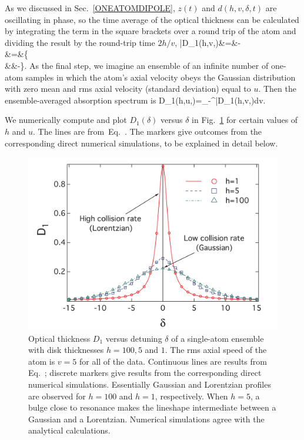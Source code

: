 As we discussed in Sec.~\ref{ONEATOMDIPOLE}, $z(t)$ and $d(h,v,\delta,t)$ are oscillating in phase, so the time average of the optical thickness can be calculated by integrating the term in the square brackets over a round trip of the atom and dividing the result by the round-trip time $2h/v$,
 \bea
\bar{D}_1(h,v,\delta)&=&-\nonumber\\
&=&\Bigg\{\nonumber\\
&&-\Bigg\}.
\label{THEORYD}
\eea
As the final step, we imagine an ensemble of an infinite number of one-atom samples in which the atom's axial velocity obeys the Gaussian distribution with zero mean and rms axial velocity (standard deviation) equal to $u$. Then the ensemble-averaged absorption spectrum is
\bea
D_1(h,u,\delta)=\int_{-\infty}^{\infty}\bar{D}_1(h,v,\delta)dv.
\label{ONEATOMSPECTRUM}
\eea

We numerically compute and plot $D_1(\delta)$ versus $\delta$ in  Fig.~\ref{SINGLESPECTRUM} for certain values of $h$ and $u$. The lines are from~Eq.~. The markers give outcomes from the corresponding direct numerical simulations, to be explained in detail below.
\begin{figure}[h!]
\begin{center}
\includegraphics[width=\textwidth]{single_atom.pdf}
\end{center}
\caption{Optical thickness $D_1$ versus detuning $\delta$ of a single-atom ensemble with disk thicknesses $h=100, 5$ and $1$. The rms axial speed of the atom is $v=5$ for all of the data. Continuous lines are results from Eq.~; discrete markers give results from the corresponding direct numerical simulations. Essentially Gaussian and Lorentzian profiles are observed for $h=100$ and $h=1$, respectively. When $h=5$, a bulge close to resonance makes the lineshape intermediate between a Gaussian and a Lorentzian. Numerical simulations agree with the analytical calculations.}
\label{SINGLESPECTRUM}
\end{figure}

